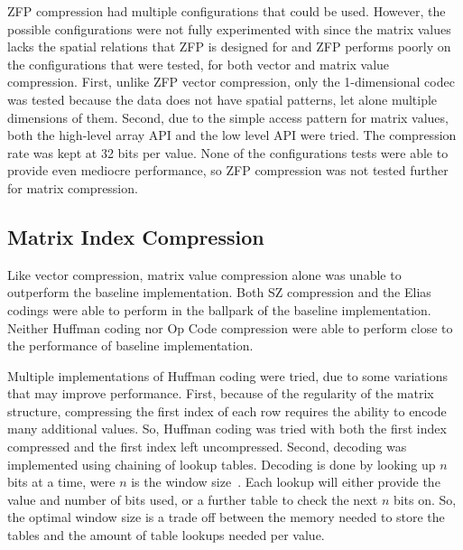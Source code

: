 ZFP compression had multiple configurations that could be used.
However, the possible configurations were not fully experimented with since the matrix values lacks the spatial relations that ZFP is designed for and ZFP performs poorly on the configurations that were tested, for both vector and matrix value compression.
First, unlike ZFP vector compression, only the 1-dimensional codec was tested because the data does not have spatial patterns, let alone multiple dimensions of them.
Second, due to the simple access pattern for matrix values, both the high-level array API and the low level API were tried.
The compression rate was kept at 32 bits per value.
None of the configurations tests were able to provide even mediocre performance, so ZFP compression was not tested further for matrix compression.

\subsection{Matrix Index Compression}
\label{sec:results-inds}
Like vector compression, matrix value compression alone was unable to outperform the baseline implementation.
Both SZ compression and the Elias codings were able to perform in the ballpark of the baseline implementation.
Neither Huffman coding nor Op Code compression were able to perform close to the performance of baseline implementation.


Multiple implementations of Huffman coding were tried, due to some variations that may improve performance.
First, because of the regularity of the matrix structure, compressing the first index of each row requires the ability to encode many additional values.
So, Huffman coding was tried with both the first index compressed and the first index left uncompressed.
Second, decoding was implemented using chaining of lookup tables.
Decoding is done by looking up \(n\) bits at a time, were \(n\) is the window size~\cite{Schindler:1998:huffman-decode}.
Each lookup will either provide the value and number of bits used, or a further table to check the next \(n\) bits on.
So, the optimal window size is a trade off between the memory needed to store the tables and the amount of table lookups needed per value.

